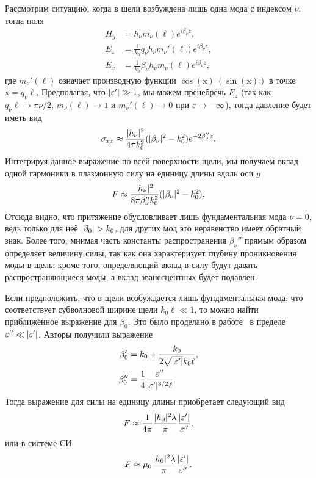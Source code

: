 Рассмотрим ситуацию, когда в щели возбуждена лишь одна мода с индексом $\nu$, тогда поля
\begin{align*}
    H_y &= h_\nu m_\nu(\ell) e^{i \beta_\nu z},  \\
    E_z &= \frac{i}{k_0} q_\nu h_\nu m_\nu'(\ell) e^{i \beta_\nu z},  \\
    E_x &= \frac{1}{k_0} \beta_\nu h_\nu m_\nu(\ell) e^{i \beta_\nu z},
\end{align*}
где $m_\nu'(\ell)$ означает производную функции $\cos(\mathrm{x}) \ (\sin(\mathrm{x}))$ в точке $\mathrm{x}= q_\nu \ell$. 
Предполагая, что $\lvert\varepsilon'\rvert \gg 1$, мы можем пренебречь $E_z$ (так как $q_\nu \ell \to \pi \nu/2$, $m_\nu(\ell) \to 1 $ и $m_\nu'(\ell) \to 0$ при $\varepsilon \to -\infty$), тогда давление будет иметь вид
\begin{equation}
   \sigma_{xx} \approx \frac{\lvert h_\nu\rvert^2}{4 \pi k_0^2}(\lvert\beta_\nu\rvert^2 - k_0^2 )e^{-2\beta_\nu'' z}.
   \label{eq:F_fund_mode_SGS}
\end{equation}
Интегрируя данное выражение по всей поверхности щели, мы получаем вклад одной гармоники в плазмонную силу на единицу длины вдоль оси $y$
\begin{equation}
  F \approx \frac{\lvert h_\nu\rvert^2}{8 \pi \beta_\nu'' k_0^2} (\lvert\beta_\nu\rvert^2 - k_0^2),
  \label{eq:F_fund_mode_SI}
\end{equation}
Отсюда видно, что притяжение обусловливает лишь фундаментальная мода $\nu = 0$, ведь только для неё $\lvert\beta_0\rvert > k_0$, для других мод это неравенство имеет обратный знак. 
Более того, мнимая часть константы распространения $\beta_\nu''$ прямым образом определяет величину силы, так как она характеризует глубину проникновения моды в щель; кроме того, определяющий вклад в силу будут давать распространяющиеся моды, а вклад эванесцентных будет подавлен.

Если предположить, что в щели возбуждается лишь фундаментальная мода, что соответствует субволновой ширине щели $k_0 \ell \ll 1$, то можно найти приближённое выражение для $\beta_0$. Это было проделано в работе~\cite{Frumin11} в пределе $\varepsilon'' \ll \lvert\varepsilon'\rvert$. Авторы получили 
выражение
\begin{align}
    \beta_0' &= k_0 + \frac{k_0}{2 \sqrt{\lvert\varepsilon'\rvert}k_0 \ell},  \\
    \beta_0'' &= \frac{1}{4}\frac{\varepsilon''}{\lvert\varepsilon'\rvert^{3/2}\ell}.
\end{align}
Тогда выражение для силы на единицу длины приобретает следующий вид
\begin{equation}
    F \approx \frac{1}{4\pi}\frac{\lvert h_0\rvert^2 \lambda}{\pi}\frac{\lvert\varepsilon'\rvert}{\varepsilon''},
\end{equation}
или в системе СИ
\begin{equation}
    F \approx \mu_0\frac{\lvert h_0\rvert^2 \lambda}{\pi}\frac{\lvert\varepsilon'\rvert}{\varepsilon''}.
\end{equation}

